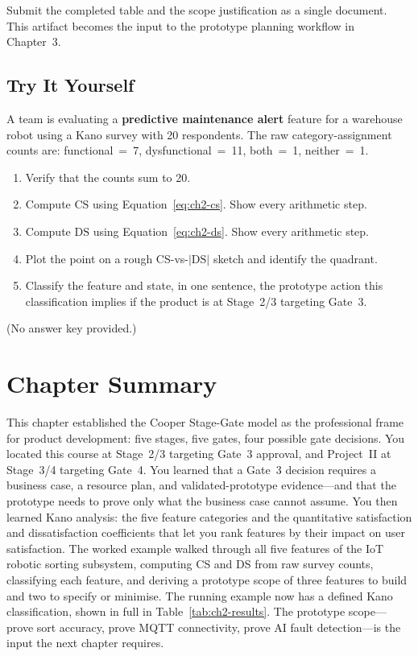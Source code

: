 Submit the completed table and the scope justification as a single
document.
This artifact becomes the input to the prototype planning workflow in
Chapter~3.

\subsection*{Try It Yourself}

A team is evaluating a \textbf{predictive maintenance alert} feature for a warehouse
robot using a Kano survey with 20 respondents.
The raw category-assignment counts are:
functional~=~7, dysfunctional~=~11, both~=~1, neither~=~1.

\begin{enumerate}
  \item Verify that the counts sum to 20.
  \item Compute $\mathrm{CS}$ using Equation~\ref{eq:ch2-cs}. Show every arithmetic
        step.
  \item Compute $\mathrm{DS}$ using Equation~\ref{eq:ch2-ds}. Show every arithmetic
        step.
  \item Plot the point on a rough CS-vs-$|\mathrm{DS}|$ sketch and identify the
        quadrant.
  \item Classify the feature and state, in one sentence, the prototype action
        this classification implies if the product is at Stage~2/3 targeting
        Gate~3.
\end{enumerate}

\noindent(No answer key provided.)

\section*{Chapter Summary}
\label{sec:ch2-summary}

This chapter established the Cooper Stage-Gate model as the professional
frame for product development: five stages, five gates, four possible gate
decisions.
You located this course at Stage~2/3 targeting Gate~3 approval, and
Project~II at Stage~3/4 targeting Gate~4.
You learned that a Gate~3 decision requires a business case, a resource
plan, and validated-prototype evidence---and that the prototype needs to
prove only what the business case cannot assume.
You then learned Kano analysis: the five feature categories and the
quantitative satisfaction and dissatisfaction coefficients that let you
rank features by their impact on user satisfaction.
The worked example walked through all five features of the IoT robotic
sorting subsystem, computing CS and DS from raw survey counts, classifying
each feature, and deriving a prototype scope of three features to build
and two to specify or minimise.
The running example now has a defined Kano classification, shown in full
in Table~\ref{tab:ch2-results}.
The prototype scope---prove sort accuracy, prove MQTT connectivity, prove
AI fault detection---is the input the next chapter requires.

